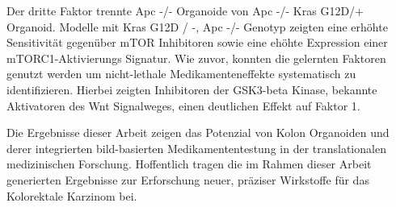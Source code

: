 Der dritte Faktor trennte Apc -/- Organoide von Apc -/- Kras G12D/+ Organoid. Modelle mit  Kras G12D / -, Apc -/- Genotyp zeigten eine erhöhte Sensitivität gegenüber mTOR Inhibitoren sowie eine ehöhte Expression einer mTORC1-Aktivierungs Signatur.
Wie zuvor, konnten die gelernten Faktoren genutzt werden um nicht-lethale Medikamenteneffekte systematisch zu identifizieren. Hierbei zeigten Inhibitoren der GSK3-beta Kinase, bekannte Aktivatoren des Wnt Signalweges, einen deutlichen Effekt auf Faktor 1.
\bigbreak

Die Ergebnisse dieser Arbeit zeigen das Potenzial von Kolon Organoiden und derer integrierten bild-basierten Medikamententestung in der translationalen medizinischen Forschung. Hoffentlich tragen die im Rahmen dieser Arbeit generierten Ergebnisse zur Erforschung neuer, präziser Wirkstoffe für das Kolorektale Karzinom bei.